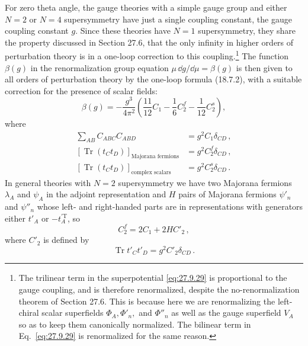 For zero theta angle, the gauge theories with a simple gauge group and either
\(N=2\) or \(N=4\) supersymmetry have just a single coupling constant, the
gauge coupling constant \(g\). Since these theories have \(N=1\)
supersymmetry, they share the property discussed in Section 27.6, that the
only infinity in higher orders of perturbation theory is in a one-loop
correction to this coupling.\footnote{The trilinear term in the
superpotential \eqref{eq:27.9.29} is proportional to the gauge coupling, and
is therefore renormalized, despite the no-renormalization theorem of Section
27.6. This is because here we are renormalizing the left-chiral scalar
superfields \(\Phi_A,\Phi'_n,\) and \(\Phi''_n\) as well as the gauge
superfield \(V_A\) so as to keep them canonically normalized. The bilinear
term in Eq.~\eqref{eq:27.9.29} is renormalized for the same reason.} The
function \(\beta(g)\) in the renormalization group equation
\(\mu\,\dd g/\dd\mu=\beta(g)\) is then given to all orders of perturbation theory
by the one-loop formula (18.7.2), with a suitable correction for the presence
of scalar fields:
\begin{equation}
  \beta(g)
  =-\frac{g^3}{4\pi^2}
    \left(\frac{11}{12}C_1-\frac16C_2^f-\frac1{12}C_2^s\right),
  \tag{27.9.45}\label{eq:27.9.45}
\end{equation}
where
\begin{equation}
  \begin{aligned}
  \sum_{AB}C_{ABC}C_{ABD}
  &=g^2C_1\delta_{CD}\,,
  \\
  \left[\operatorname{Tr}(t_Ct_D)\right]_{\text{Majorana fermions}}
  &=g^2C_2^f\delta_{CD}\,,
  \\
  \left[\operatorname{Tr}(t_Ct_D)\right]_{\text{complex scalars}}
  &=g^2C_2^s\delta_{CD}\,.
  \end{aligned}
  \tag{27.9.46}\label{eq:27.9.46}
\end{equation}
In general theories with \(N=2\) supersymmetry we have two Majorana fermions
\(\lambda_A\) and \(\psi_A\) in the adjoint representation and \(H\) pairs of
Majorana fermions \(\psi'_n\) and \(\psi''_n\) whose left- and right-handed
parts are in representations with generators either \(t'_A\) or
\(-t_A^{\prime\mathrm T}\), so
\begin{equation}
  C_2^f=2C_1+2HC'_2\,,
  \tag{27.9.47}\label{eq:27.9.47}
\end{equation}
where \(C'_2\) is defined by
\begin{equation}
  \operatorname{Tr}t'_Ct'_D=g^2C'_2\delta_{CD}\,.
  \tag{27.9.48}\label{eq:27.9.48}
\end{equation}
